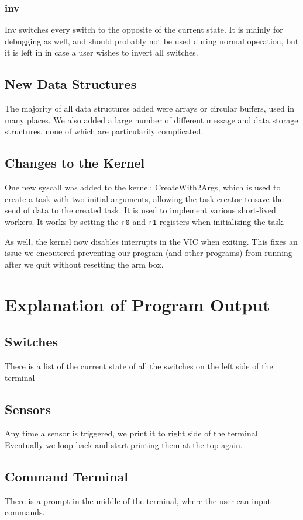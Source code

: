 \documentclass{article}
\begin{document}
\subsubsection{inv}
Inv switches every switch to the opposite of the current state. It is mainly for debugging as well, and should probably not be used during normal operation, but it is left in in case a user wishes to invert all switches.

\subsection{New Data Structures}
    The majority of all data structures added were arrays or circular buffers, used in many places. We also added a large number of different message and data storage structures, none of which are particularily complicated. 

\subsection{Changes to the Kernel}
    One new syscall was added to the kernel: CreateWith2Args, which is used to create a task with two initial arguments, allowing the task creator to save the send of data to the created task. It is used to implement various short-lived workers. It works by setting the \verb|r0| and \verb|r1| registers when initializing the task.

    As well, the kernel now disables interrupts in the VIC when exiting. This fixes an issue we encoutered preventing our program (and other programs) from running after we quit without resetting the arm box.
\section{Explanation of Program Output}

\subsection{Switches}
There is a list of the current state of all the switches on the left side of the terminal
\subsection{Sensors}
Any time a sensor is triggered, we print it to right side of the terminal. Eventually we loop back and start printing them at the top again.
\subsection{Command Terminal}
There is a prompt in the middle of the terminal, where the user can input commands.
\end{document}

